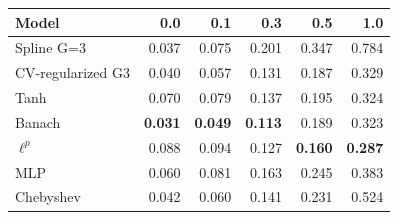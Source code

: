 \begin{tabular}{lrrrrr}
\toprule
Model & 0.0 & 0.1 & 0.3 & 0.5 & 1.0 \\
\midrule
Spline G=3 & 0.037 & 0.075 & 0.201 & 0.347 & 0.784 \\
CV-regularized G3 & 0.040 & 0.057 & 0.131 & 0.187 & 0.329 \\
Tanh & 0.070 & 0.079 & 0.137 & 0.195 & 0.324 \\
Banach & \textbf{0.031} & \textbf{0.049} & \textbf{0.113} & 0.189 & 0.323 \\
$\ell^p$ & 0.088 & 0.094 & 0.127 & \textbf{0.160} & \textbf{0.287} \\
MLP & 0.060 & 0.081 & 0.163 & 0.245 & 0.383 \\
Chebyshev & 0.042 & 0.060 & 0.141 & 0.231 & 0.524 \\
\bottomrule
\end{tabular}
